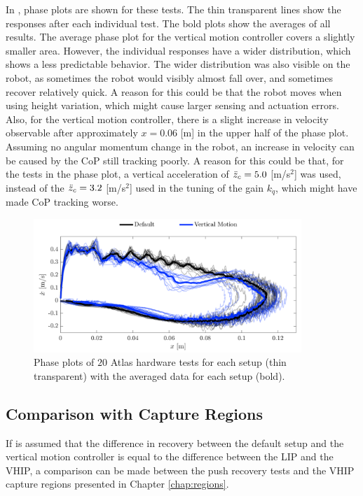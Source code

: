 In , phase plots are shown for these tests. The thin transparent lines show the responses after each individual test. The bold plots show the averages of all results. The average phase plot for the vertical motion controller covers a slightly smaller area. However, the individual responses have a wider distribution, which shows a less predictable behavior. The wider distribution was also visible on the robot, as sometimes the robot would visibly almost fall over, and sometimes recover relatively quick. A reason for this could be that the robot moves when using height variation, which might cause larger sensing and actuation errors. Also, for the vertical motion controller, there is a slight increase in velocity observable after approximately $x=0.06$ [m] in the upper half of the phase plot. Assuming no angular momentum change in the robot, an increase in velocity can be caused by the \ac{CoP} still tracking poorly. A reason for this could be that, for the tests in the phase plot, a vertical acceleration of $\ddot{z}_{c}=5.0$ [m/s$^2$] was used, instead of the $\ddot{z}_{c}=3.2$ [m/s$^2$] used in the tuning of the gain $k_{\dot{q}}$, which might have made \ac{CoP} tracking worse.

\begin{figure}
\centering
\includegraphics[width=0.9\textwidth]{STYLESTUFF/atlasphaseHW.png}
\caption{Phase plots of $20$ Atlas hardware tests for each setup (thin transparent) with the averaged data for each setup (bold).}
\label{fig:atlasphaseHW}
\end{figure}

\subsection{Comparison with Capture Regions}
If is assumed that the difference in recovery between the default setup and the vertical motion controller is equal to the difference between the \ac{LIP} and the \ac{VHIP}, a comparison can be made between the push recovery tests and the \ac{VHIP} capture regions presented in Chapter \ref{chap:regions}.


